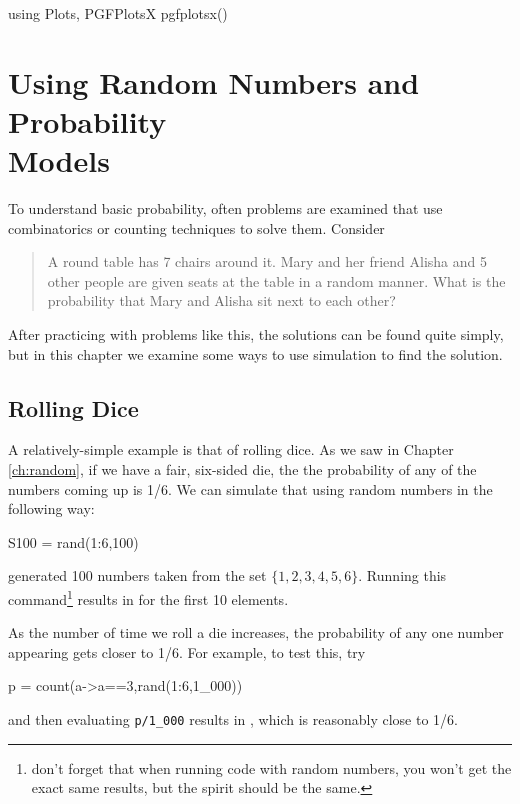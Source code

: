 
\begin{jlcode}[prob]
using Plots, PGFPlotsX
pgfplotsx()
\end{jlcode}

\chapter{Using Random Numbers and \texorpdfstring{Probability\\ Models}{Probability Models}} \label{ch:prob-models}

To understand basic probability, often problems are examined that use combinatorics or counting techniques to solve them.  Consider 

\begin{quote}
A round table has 7 chairs around it.  Mary and her friend Alisha and 5 other people are given seats at the table in a random manner.  What is the probability that Mary and Alisha sit next to each other?
\end{quote}

After practicing with problems like this, the solutions can be found quite simply, but in this chapter we examine some ways to use simulation to find the solution.

\section{Rolling Dice}

A relatively-simple example is that of rolling dice.  As we saw in Chapter \ref{ch:random}, if we have a fair, six-sided die, the the probability of any of the numbers coming up is 1/6.  We can simulate that using random numbers in the following way:
\begin{jlblock}[prob]
S100 = rand(1:6,100)
\end{jlblock}
generated 100 numbers taken from the set $\{1,2,3,4,5,6\}$.  Running this command\footnote{don't forget that when running code with random numbers, you won't get the exact same results, but the spirit should be the same.} results in  for the first 10 elements. 

As the number of time we roll a die increases, the probability of any one number appearing gets closer to 1/6.  For example, to test this, try
\begin{jlblock}[prob]
p = count(a->a==3,rand(1:6,1_000))
\end{jlblock}
and then evaluating \verb!p/1_000! results in  \printpythontex[verb], which is reasonably close to 1/6. 


